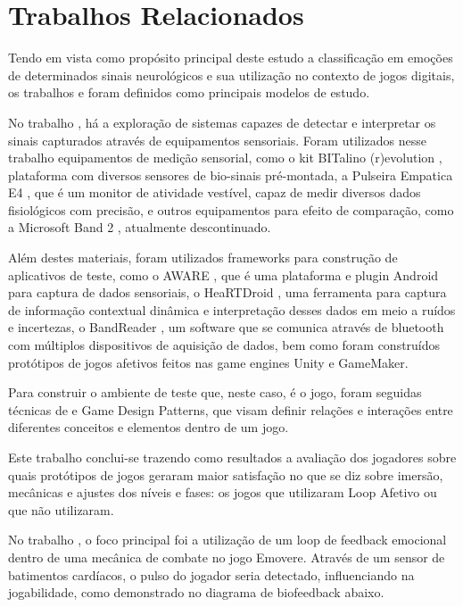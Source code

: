 \chapter{Trabalhos Relacionados} \label{trabs}

Tendo em vista como propósito principal deste estudo a classificação em emoções de determinados sinais neurológicos e sua utilização no contexto de jogos digitais, os trabalhos \cite{nalepa2019emotionalcontext} e \cite{filipa2019emovere} foram definidos como principais modelos de estudo.

No trabalho \cite{nalepa2019emotionalcontext}, há a exploração de sistemas capazes de detectar e interpretar os sinais capturados através de equipamentos sensoriais. Foram utilizados nesse trabalho equipamentos de medição sensorial, como o kit BITalino (r)evolution \cite{bitalinoprosuto}, plataforma com diversos sensores de bio-sinais pré-montada, a Pulseira Empatica E4 \cite{empatica4site}, que é um monitor de atividade vestível, capaz de medir diversos dados fisiológicos com precisão, e outros equipamentos para efeito de comparação, como a Microsoft Band 2 \cite{Microsoftband2}, atualmente descontinuado.

Além destes materiais, foram utilizados frameworks para construção de aplicativos de teste, como o AWARE \cite{awaresite}, que é uma plataforma e plugin Android para captura de dados sensoriais, o HeaRTDroid \cite{heartdroidsite}, uma ferramenta para captura de informação contextual dinâmica e interpretação desses dados em meio a ruídos e incertezas, o BandReader \cite{bandreader}, um software que se comunica através de bluetooth com múltiplos dispositivos de aquisição de dados, bem como foram construídos protótipos de jogos afetivos feitos nas game engines Unity e GameMaker.

Para construir o ambiente de teste que, neste caso, é o jogo, foram seguidas técnicas de e Game Design Patterns, que visam definir relações e interações entre diferentes conceitos e elementos dentro de um jogo.

Este trabalho conclui-se trazendo como resultados a avaliação dos jogadores sobre quais protótipos de jogos geraram maior satisfação no que se diz sobre imersão, mecânicas e ajustes dos níveis e fases: os jogos que utilizaram Loop Afetivo ou que não utilizaram.

No trabalho \cite{filipa2019emovere}, o foco principal foi a utilização de um loop de feedback emocional dentro de uma mecânica de combate no jogo Emovere. Através de um sensor de batimentos cardíacos, o pulso do jogador seria detectado, influenciando na jogabilidade, como demonstrado no diagrama de biofeedback abaixo.

